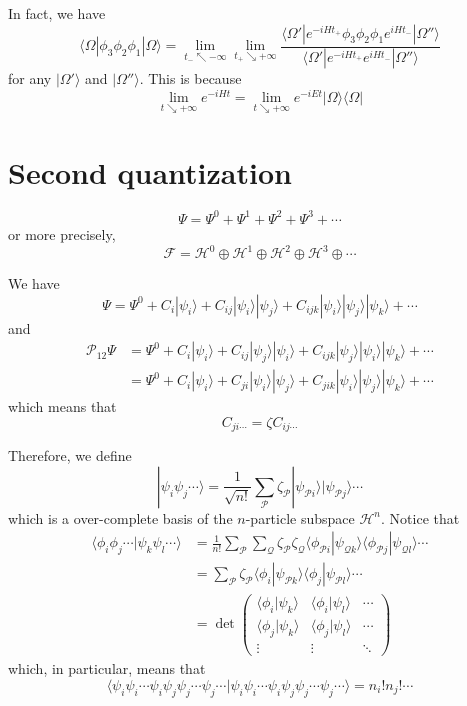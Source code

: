 \documentclass[12pt, oneside]{book}
\begin{document}
In fact, we have
\[
\langle\Omega|\phi_3\phi_2\phi_1|\Omega\rangle=\lim_{t_-\nwarrow-\infty}\lim_{t_+\searrow+\infty}\frac{\langle\Omega'|e^{-iHt_+}\phi_3\phi_2\phi_1e^{iHt_-}|\Omega''\rangle}{\langle\Omega'|e^{-iHt_+}e^{iHt_-}|\Omega''\rangle}
\]
for any $|\Omega'\rangle$ and $|\Omega''\rangle$. This is because
\[
\lim_{t\searrow+\infty}e^{-iHt}=\lim_{t\searrow+\infty}e^{-iEt}|\Omega\rangle\langle\Omega|
\]

\section*{Second quantization}
\[
\Psi=\Psi^0+\Psi^1+\Psi^2+\Psi^3+\cdots
\]
or more precisely,
\[
\mathcal{F}=\mathcal{H}^0\oplus\mathcal{H}^1\oplus\mathcal{H}^2\oplus\mathcal{H}^3\oplus\cdots
\]

We have
\[
\Psi=\Psi^0+C_i|\psi_i\rangle+C_{ij}|\psi_i\rangle|\psi_j\rangle+C_{ijk}|\psi_i\rangle|\psi_j\rangle|\psi_k\rangle+\cdots
\]
and
\begin{align*}
\mathcal{P}_{12}\Psi
&=\Psi^0+C_i|\psi_i\rangle+C_{ij}|\psi_j\rangle|\psi_i\rangle+C_{ijk}|\psi_j\rangle|\psi_i\rangle|\psi_k\rangle+\cdots\\
&=\Psi^0+C_i|\psi_i\rangle+C_{ji}|\psi_i\rangle|\psi_j\rangle+C_{jik}|\psi_i\rangle|\psi_j\rangle|\psi_k\rangle+\cdots
\end{align*}
which means that
\[
C_{ji\cdots}=\zeta C_{ij\cdots}
\]

Therefore, we define
\[
|\psi_i\psi_j\cdots\rangle=\frac1{\sqrt{n!}}\sum_{\mathcal{P}}\zeta_{\mathcal{P}}|\psi_{\mathcal{P}i}\rangle|\psi_{\mathcal{P}j}\rangle\cdots
\]
which is a over-complete basis of the $n$-particle subspace $\mathcal{H}^n$. Notice that
\begin{align*}
\langle\phi_i\phi_j\cdots|\psi_k\psi_l\cdots\rangle
&=\frac1{n!}\sum_{\mathcal{P}}\sum_{\mathcal{Q}}\zeta_{\mathcal{P}}\zeta_{\mathcal{Q}}\langle\phi_{\mathcal{P}i}|\psi_{\mathcal{Q}k}\rangle\langle\phi_{\mathcal{P}j}|\psi_{\mathcal{Q}l}\rangle\cdots\\
&=\sum_{\mathcal{P}}\zeta_{\mathcal{P}}\langle\phi_i|\psi_{\mathcal{P}k}\rangle\langle\phi_j|\psi_{\mathcal{P}l}\rangle\cdots\\
&=\det{\begin{pmatrix}
\langle\phi_i|\psi_k\rangle&\langle\phi_i|\psi_l\rangle&\cdots\\
\langle\phi_j|\psi_k\rangle&\langle\phi_j|\psi_l\rangle&\cdots\\
\vdots&\vdots&\ddots
\end{pmatrix}}
\end{align*}
which, in particular, means that
\[
\langle\psi_i\psi_i\cdots\psi_i\psi_j\psi_j\cdots\psi_j\cdots|\psi_i\psi_i\cdots\psi_i\psi_j\psi_j\cdots\psi_j\cdots\rangle=n_i!n_j!\cdots
\]
\end{document}

